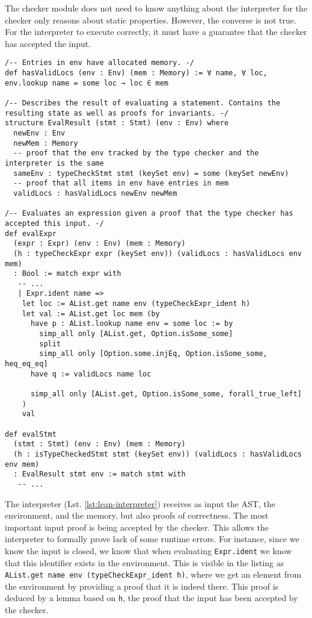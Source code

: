 The checker module does not need to know anything about the interpreter for the checker only reasons about static properties. However, the converse is not true. For the interpreter to execute correctly, it must have a guarantee that the checker has accepted the input.


\begin{lstlisting}[language=lean,caption={The interpreter. Evaluates structures given proofs of correctness. Cut for brevity.},label={lst:lean-interpreter},frame=none,escapechar=*,basicstyle=\tt\scriptsize]
/-- Entries in env have allocated memory. -/
def hasValidLocs (env : Env) (mem : Memory) := ∀ name, ∀ loc, env.lookup name = some loc → loc ∈ mem

/-- Describes the result of evaluating a statement. Contains the resulting state as well as proofs for invariants. -/
structure EvalResult (stmt : Stmt) (env : Env) where
  newEnv : Env
  newMem : Memory
  -- proof that the env tracked by the type checker and the interpreter is the same
  sameEnv : typeCheckStmt stmt (keySet env) = some (keySet newEnv)
  -- proof that all items in env have entries in mem
  validLocs : hasValidLocs newEnv newMem

/-- Evaluates an expression given a proof that the type checker has accepted this input. -/
def evalExpr
  (expr : Expr) (env : Env) (mem : Memory)
  (h : typeCheckExpr expr (keySet env)) (validLocs : hasValidLocs env mem)
  : Bool := match expr with
   -- ...
   | Expr.ident name =>
    let loc := AList.get name env (typeCheckExpr_ident h)
    let val := AList.get loc mem (by
      have p : AList.lookup name env = some loc := by
        simp_all only [AList.get, Option.isSome_some]
        split
        simp_all only [Option.some.injEq, Option.isSome_some, heq_eq_eq]
      have q := validLocs name loc

      simp_all only [AList.get, Option.isSome_some, forall_true_left]
    )
    val

def evalStmt
  (stmt : Stmt) (env : Env) (mem : Memory)
  (h : isTypeCheckedStmt stmt (keySet env)) (validLocs : hasValidLocs env mem)
  : EvalResult stmt env := match stmt with
   -- ...
\end{lstlisting}

The interpreter (Lst. \ref{lst:lean-interpreter}) receives as input the AST, the environment, and the memory, but also proofs of correctness. The most important input proof is being accepted by the checker. This allows the interpreter to formally prove lack of some runtime errors. For instance, since we know the input is closed, we know that when evaluating \texttt{Expr.ident} we know that this identifier exists in the environment. This is visible in the listing as \texttt{AList.get name env (typeCheckExpr_ident h)}, where we get an element from the environment by providing a proof that it is indeed there. This proof is deduced by a lemma based on \texttt{h}, the proof that the input has been accepted by the checker.

